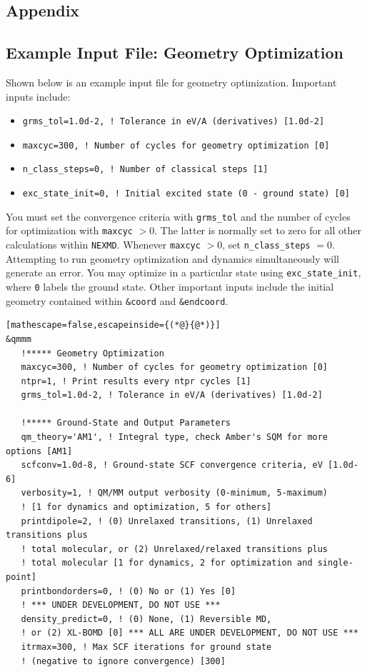 \documentclass[letterpaper,12pt,titlepage]{article}
\begin{document}
\newpage
\begin{appendix}
\section{Appendix}
\subsection{Example Input File: Geometry Optimization}
\label{input_geopt}
Shown below is an example input file for geometry optimization.  Important inputs include:
\begin{itemize}
\item \verb+grms_tol=1.0d-2, ! Tolerance in eV/A (derivatives) [1.0d-2]+
\item \verb+maxcyc=300, ! Number of cycles for geometry optimization [0]+
\item \verb+n_class_steps=0, ! Number of classical steps [1]+
\item \verb+exc_state_init=0, ! Initial excited state (0 - ground state) [0]+
\end{itemize}
You must set the convergence criteria with \verb+grms_tol+ and the number of cycles for optimization with \verb+maxcyc+ $> 0$.  The latter is normally set to zero for all other calculations within \verb+NEXMD+.  Whenever \verb+maxcyc+ $>0$, set \verb+n_class_steps+ $= 0$.  Attempting to run geometry optimization and dynamics simultaneously will generate an error.  You may optimize in a particular state using \verb+exc_state_init+, where \verb+0+ labels the ground state.  Other important inputs include the initial geometry contained within \verb+&coord+ and \verb+&endcoord+.
\begin{lstlisting}[mathescape=false,escapeinside={(*@}{@*)}]
&qmmm
   !***** Geometry Optimization
   maxcyc=300, ! Number of cycles for geometry optimization [0]
   ntpr=1, ! Print results every ntpr cycles [1]
   grms_tol=1.0d-2, ! Tolerance in eV/A (derivatives) [1.0d-2]

   !***** Ground-State and Output Parameters
   qm_theory='AM1', ! Integral type, check Amber's SQM for more options [AM1]
   scfconv=1.0d-8, ! Ground-state SCF convergence criteria, eV [1.0d-6]
   verbosity=1, ! QM/MM output verbosity (0-minimum, 5-maximum)
   ! [1 for dynamics and optimization, 5 for others]
   printdipole=2, ! (0) Unrelaxed transitions, (1) Unrelaxed transitions plus 
   ! total molecular, or (2) Unrelaxed/relaxed transitions plus 
   ! total molecular [1 for dynamics, 2 for optimization and single-point]
   printbondorders=0, ! (0) No or (1) Yes [0]
   ! *** UNDER DEVELOPMENT, DO NOT USE ***
   density_predict=0, ! (0) None, (1) Reversible MD, 
   ! or (2) XL-BOMD [0] *** ALL ARE UNDER DEVELOPMENT, DO NOT USE ***
   itrmax=300, ! Max SCF iterations for ground state 
   ! (negative to ignore convergence) [300]


\end{lstlisting}
\end{appendix}
\end{document}
